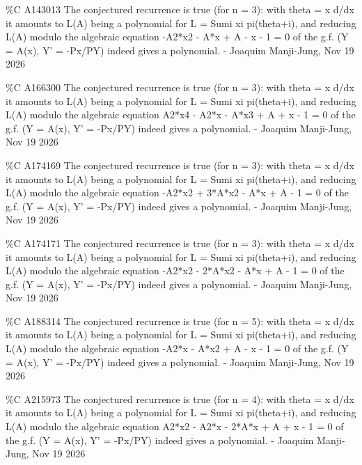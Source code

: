 {\%C A143013 The conjectured recurrence is true (for n = 3): with theta = x d/dx it amounts to L(A) being a polynomial for L = Sumi xi pi(theta+i), and reducing L(A) modulo the algebraic equation -A2*x2 - A*x + A - x - 1 = 0 of the g.f. (Y = A(x), Y' = -Px/PY) indeed gives a polynomial. - Joaquim Manji-Jung, Nov 19 2026\par
\%C A166300 The conjectured recurrence is true (for n = 3): with theta = x d/dx it amounts to L(A) being a polynomial for L = Sumi xi pi(theta+i), and reducing L(A) modulo the algebraic equation A2*x4 - A2*x - A*x3 + A + x - 1 = 0 of the g.f. (Y = A(x), Y' = -Px/PY) indeed gives a polynomial. - Joaquim Manji-Jung, Nov 19 2026\par
\%C A174169 The conjectured recurrence is true (for n = 3): with theta = x d/dx it amounts to L(A) being a polynomial for L = Sumi xi pi(theta+i), and reducing L(A) modulo the algebraic equation -A2*x2 + 3*A*x2 - A*x + A - 1 = 0 of the g.f. (Y = A(x), Y' = -Px/PY) indeed gives a polynomial. - Joaquim Manji-Jung, Nov 19 2026\par
\%C A174171 The conjectured recurrence is true (for n = 3): with theta = x d/dx it amounts to L(A) being a polynomial for L = Sumi xi pi(theta+i), and reducing L(A) modulo the algebraic equation -A2*x2 - 2*A*x2 - A*x + A - 1 = 0 of the g.f. (Y = A(x), Y' = -Px/PY) indeed gives a polynomial. - Joaquim Manji-Jung, Nov 19 2026\par
\%C A188314 The conjectured recurrence is true (for n = 5): with theta = x d/dx it amounts to L(A) being a polynomial for L = Sumi xi pi(theta+i), and reducing L(A) modulo the algebraic equation -A2*x - A*x2 + A - x - 1 = 0 of the g.f. (Y = A(x), Y' = -Px/PY) indeed gives a polynomial. - Joaquim Manji-Jung, Nov 19 2026\par
\%C A215973 The conjectured recurrence is true (for n = 4): with theta = x d/dx it amounts to L(A) being a polynomial for L = Sumi xi pi(theta+i), and reducing L(A) modulo the algebraic equation A2*x2 - A2*x - 2*A*x + A + x - 1 = 0 of the g.f. (Y = A(x), Y' = -Px/PY) indeed gives a polynomial. - Joaquim Manji-Jung, Nov 19 2026\par
}

